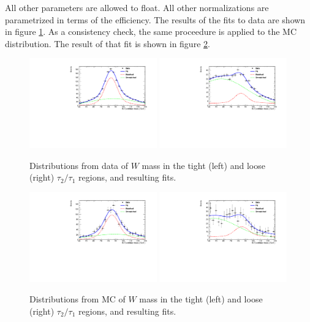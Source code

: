 All other parameters are allowed to float. All other normalizations are parametrized in terms of the efficiency. The results of the fits to data are shown in figure \ref{fig:datafits}. As a consistency check, the same proceedure is applied to the MC distribution. The result of that fit is shown in figure \ref{fig:mcfits}.
\begin{figure}[h!]
\centering
        \includegraphics[width=0.49\textwidth]{figs/WtagSF/MCTIGHT.pdf}
	\includegraphics[width=0.49\textwidth]{figs/WtagSF/MCLOOSE.pdf}
        \caption{Distributions from data of $W$ mass in the tight (left) and loose (right) $\tau_2/\tau_1$ regions, and resulting fits.}\label{fig:datafits}
\end{figure}
\begin{figure}[h!]
\centering
        \includegraphics[width=0.49\textwidth]{figs/WtagSF/TIGHT.pdf}
	\includegraphics[width=0.49\textwidth]{figs/WtagSF/LOOSE.pdf}
        \caption{Distributions from MC of $W$ mass in the tight (left) and loose (right) $\tau_2/\tau_1$ regions, and resulting fits.}\label{fig:mcfits}
\end{figure}

